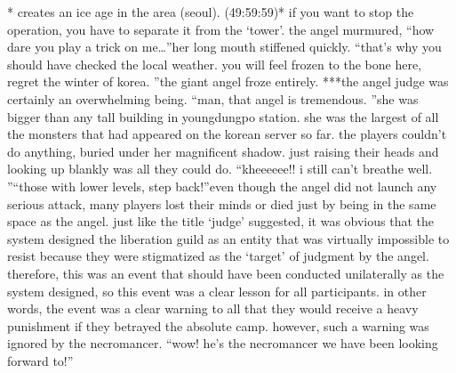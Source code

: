 * creates an ice age in the area (seoul).
 (49:59:59)* if you want to stop the operation, you have to separate it from the ‘tower’.
the angel murmured, “how dare you play a trick on me…”her long mouth stiffened quickly.
“that’s why you should have checked the local weather.
 you will feel frozen to the bone here, regret the winter of korea.
”the giant angel froze entirely.
***the angel judge was certainly an overwhelming being.
“man, that angel is tremendous.
”she was bigger than any tall building in youngdungpo station.
 she was the largest of all the monsters that had appeared on the korean server so far.
the players couldn’t do anything, buried under her magnificent shadow.
 just raising their heads and looking up blankly was all they could do.
“kheeeeee!! i still can’t breathe well.
”“those with lower levels, step back!”even though the angel did not launch any serious attack, many players lost their minds or died just by being in the same space as the angel.
just like the title ‘judge’ suggested, it was obvious that the system designed the liberation guild as an entity that was virtually impossible to resist because they were stigmatized as the ‘target’ of judgment by the angel.
therefore, this was an event that should have been conducted unilaterally as the system designed, so this event was a clear lesson for all participants.
 in other words, the event was a clear warning to all that they would receive a heavy punishment if they betrayed the absolute camp.
however, such a warning was ignored by the necromancer.
“wow! he’s the necromancer we have been looking forward to!”

 